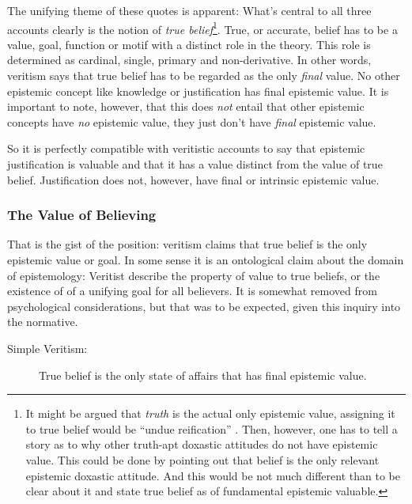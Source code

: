 \documentclass[12pt,numbers=noenddot]{scrartcl}
\begin{document}
The unifying theme of these quotes is apparent: What’s central to all three accounts clearly is the notion of \emph{true belief}\footnote{It might be argued that \emph{truth} is the actual only epistemic value, assigning it to true belief would be “undue reification” \autocite{Pritchard2014}. Then, however, one has to tell a story as to why other truth-apt doxastic attitudes do not have epistemic value. This could be done by pointing out that belief is the only relevant epistemic doxastic attitude. And this would be not much different than to be clear about it and state true belief as of fundamental epistemic valuable.}. True, or accurate, belief has to be a value, goal, function or motif with a distinct role in the theory. This role is determined as cardinal, single, primary and non-derivative. In other words, veritism says that true belief has to be regarded as the only \emph{final} value. No other epistemic concept like knowledge or justification has final epistemic value. It is important to note, however, that this does \emph{not} entail that other epistemic concepts have \emph{no} epistemic value, they just don’t have \emph{final} epistemic value.

So it is perfectly compatible with veritistic accounts to say that epistemic justification is valuable and that it has a value distinct from the value of true belief. Justification does not, however, have final or intrinsic epistemic value.

\subsubsection{The Value of Believing}
That is the gist of the position: veritism claims that true belief is the only epistemic value or goal. In some sense it is an ontological claim about the domain of epistemology: Veritist describe the property of value to true beliefs, or the existence of of a unifying goal for all believers. It is somewhat removed from psychological considerations, but that was to be expected, given this inquiry into the normative.

\begin{description}
    \item[Simple Veritism:] True belief is the only state of affairs that has final epistemic value.
\end{description}

\end{document}

